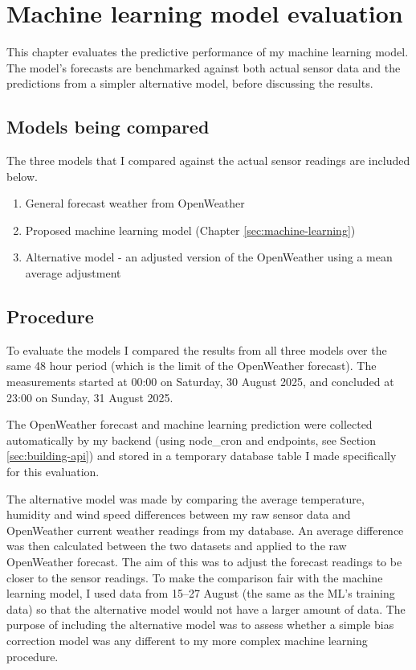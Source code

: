 \section{Machine learning model evaluation}

This chapter evaluates the predictive performance of my machine learning model.
The model's forecasts are benchmarked against both actual sensor data and the
predictions from a simpler alternative model, before discussing the results.

\subsection{Models being compared}

The three models that I compared against the actual sensor readings are included
below.

\begin{enumerate}
    \item{General forecast weather from OpenWeather} 
    \item{Proposed machine learning model (Chapter \ref{sec:machine-learning})} 
    \item{Alternative model - an adjusted version of the OpenWeather using a mean average adjustment}
\end{enumerate}

\subsection{Procedure}

To evaluate the models I compared the results from all three models over the
same 48 hour period (which is the limit of the OpenWeather forecast). The
measurements started at 00:00 on Saturday, 30 August 2025, and concluded at
23:00 on Sunday, 31 August 2025. 

The OpenWeather forecast and machine learning prediction were collected
automatically by my backend (using node\_cron and endpoints, see Section
\ref{sec:building-api}) and stored in a temporary database table I made
specifically for this evaluation.

The alternative model was made by comparing the average temperature, humidity
and wind speed differences between my raw sensor data and OpenWeather current
weather readings from my database. An average difference was then calculated
between the two datasets and applied to the raw OpenWeather forecast. The aim of
this was to adjust the forecast readings to be closer to the sensor readings. To
make the comparison fair with the machine learning model, I used data from
15--27 August (the same as the ML's training data) so that the alternative model
would not have a larger amount of data. The purpose of including the alternative
model was to assess whether a simple bias correction model was any different to
my more complex machine learning procedure.

